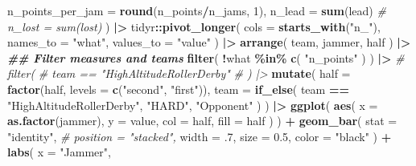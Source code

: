 \documentclass[
]{article}
\newenvironment{Shaded}{\begin{snugshade}}{\end{snugshade}}
\newcommand{\AttributeTok}[1]{\textcolor[rgb]{0.13,0.29,0.53}{#1}}
\newcommand{\CommentTok}[1]{\textcolor[rgb]{0.56,0.35,0.01}{\textit{#1}}}
\newcommand{\DecValTok}[1]{\textcolor[rgb]{0.00,0.00,0.81}{#1}}
\newcommand{\DocumentationTok}[1]{\textcolor[rgb]{0.56,0.35,0.01}{\textbf{\textit{#1}}}}
\newcommand{\FloatTok}[1]{\textcolor[rgb]{0.00,0.00,0.81}{#1}}
\newcommand{\FunctionTok}[1]{\textcolor[rgb]{0.13,0.29,0.53}{\textbf{#1}}}
\newcommand{\NormalTok}[1]{#1}
\newcommand{\SpecialCharTok}[1]{\textcolor[rgb]{0.81,0.36,0.00}{\textbf{#1}}}
\newcommand{\StringTok}[1]{\textcolor[rgb]{0.31,0.60,0.02}{#1}}
\begin{document}
\begin{Shaded}
\begin{Highlighting}[]
        \AttributeTok{n\_points\_per\_jam =} \FunctionTok{round}\NormalTok{(n\_points}\SpecialCharTok{/}\NormalTok{n\_jams, }\DecValTok{1}\NormalTok{),}
        \AttributeTok{n\_lead =} \FunctionTok{sum}\NormalTok{(lead)}
        \CommentTok{\# n\_lost = sum(lost)}
\NormalTok{      ) }\SpecialCharTok{|\textgreater{}}
\NormalTok{      tidyr}\SpecialCharTok{::}\FunctionTok{pivot\_longer}\NormalTok{(}
        \AttributeTok{cols =} \FunctionTok{starts\_with}\NormalTok{(}\StringTok{"n\_"}\NormalTok{),}
        \AttributeTok{names\_to =} \StringTok{"what"}\NormalTok{,}
        \AttributeTok{values\_to =} \StringTok{"value"}
\NormalTok{      ) }\SpecialCharTok{|\textgreater{}}
      \FunctionTok{arrange}\NormalTok{(}
\NormalTok{        team,}
\NormalTok{        jammer,}
\NormalTok{        half}
\NormalTok{      ) }\SpecialCharTok{|\textgreater{}}
      \DocumentationTok{\#\# Filter measures and teams}
      \FunctionTok{filter}\NormalTok{(}
        \SpecialCharTok{!}\NormalTok{what }\SpecialCharTok{\%in\%} \FunctionTok{c}\NormalTok{(}
          \StringTok{"n\_points"}
\NormalTok{        )}
\NormalTok{      ) }\SpecialCharTok{|\textgreater{}}
      \CommentTok{\# filter(}
      \CommentTok{\#   team == "HighAltitudeRollerDerby"}
      \CommentTok{\# ) |\textgreater{}}
      \FunctionTok{mutate}\NormalTok{(}
        \AttributeTok{half =} \FunctionTok{factor}\NormalTok{(half, }\AttributeTok{levels =} \FunctionTok{c}\NormalTok{(}\StringTok{"second"}\NormalTok{, }\StringTok{"first"}\NormalTok{)),}
        \AttributeTok{team =} \FunctionTok{if\_else}\NormalTok{(}
\NormalTok{          team }\SpecialCharTok{==} \StringTok{"HighAltitudeRollerDerby"}\NormalTok{,}
          \StringTok{"HARD"}\NormalTok{,}
          \StringTok{"Opponent"}
\NormalTok{        )}
\NormalTok{      ) }\SpecialCharTok{|\textgreater{}}
      \FunctionTok{ggplot}\NormalTok{(}
        \FunctionTok{aes}\NormalTok{(}
          \AttributeTok{x =} \FunctionTok{as.factor}\NormalTok{(jammer),}
          \AttributeTok{y =}\NormalTok{ value,}
          \AttributeTok{col =}\NormalTok{ half,}
          \AttributeTok{fill =}\NormalTok{ half}
\NormalTok{        )}
\NormalTok{      ) }\SpecialCharTok{+}
      \FunctionTok{geom\_bar}\NormalTok{(}
        \AttributeTok{stat =} \StringTok{"identity"}\NormalTok{,}
        \CommentTok{\# position = "stacked",}
        \AttributeTok{width =}\NormalTok{ .}\DecValTok{7}\NormalTok{,}
        \AttributeTok{size =} \FloatTok{0.5}\NormalTok{,}
        \AttributeTok{color =} \StringTok{"black"}
\NormalTok{      ) }\SpecialCharTok{+}
      \FunctionTok{labs}\NormalTok{(}
        \AttributeTok{x =} \StringTok{"Jammer"}\NormalTok{,}

\end{Highlighting}
\end{Shaded}
\end{document}
